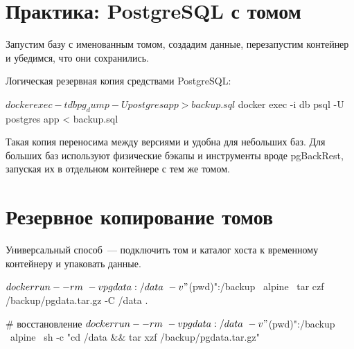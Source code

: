 \section{Практика: PostgreSQL с томом}

Запустим базу с именованным томом, создадим данные, перезапустим
контейнер и убедимся, что они сохранились.


Логическая резервная копия средствами PostgreSQL:

\begin{code}[language=bash]
$ docker exec -t db pg_dump -U postgres app > backup.sql
$ docker exec -i db psql -U postgres app < backup.sql
\end{code}

Такая копия переносима между версиями и удобна для небольших баз.
Для больших баз используют физические бэкапы и инструменты вроде
pgBackRest, запуская их в отдельном контейнере с тем же томом.

\section{Резервное копирование томов}

Универсальный способ~--- подключить том и каталог хоста к временному
контейнеру и упаковать данные.

\begin{code}[language=bash]
$ docker run --rm \
    -v pgdata:/data \
    -v "$(pwd)":/backup \
    alpine \
    tar czf /backup/pgdata.tar.gz -C /data .

# восстановление
$ docker run --rm \
    -v pgdata:/data \
    -v "$(pwd)":/backup \
    alpine \
    sh -c "cd /data && tar xzf /backup/pgdata.tar.gz"
\end{code}

